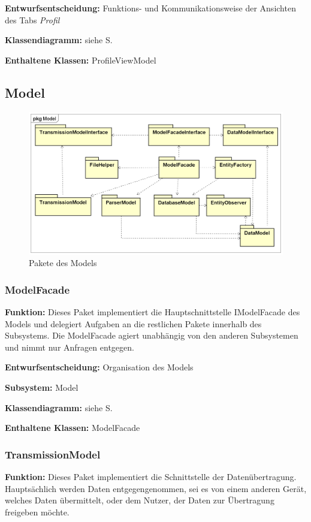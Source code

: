 \documentclass[a4paper]{scrreprt}
\begin{document}
\textbf{Entwurfsentscheidung:} Funktions- und Kommunikationsweise der Ansichten des Tabs \textit{Profil}

\textbf{Klassendiagramm:} siehe S.

\textbf{Enthaltene Klassen:} ProfileViewModel

\subsection{Model}
\begin{figure}[H]
\centering
\includegraphics[width=0.75\textheight]{graphics/Klassendiagramme/Model/ModelPackage.png}
\caption{Pakete des Models}
\end{figure}
\subsubsection{ModelFacade}
\textbf{Funktion:} Dieses Paket implementiert die Hauptschnittstelle IModelFacade des Models und delegiert Aufgaben an die restlichen Pakete innerhalb des Subsystems.
Die ModelFacade agiert unabhängig von den anderen Subsystemen und nimmt nur Anfragen entgegen.

\textbf{Entwurfsentscheidung:} Organisation des Models

\textbf{Subsystem:} Model

\textbf{Klassendiagramm:} siehe S.

\textbf{Enthaltene Klassen:} ModelFacade

\subsubsection{TransmissionModel}
\textbf{Funktion:} Dieses Paket implementiert die Schnittstelle der Datenübertragung. Hauptsächlich werden Daten entgegengenommen, sei es von einem anderen Gerät, welches Daten übermittelt, oder dem Nutzer, der Daten zur Übertragung freigeben möchte. 
\end{document}
